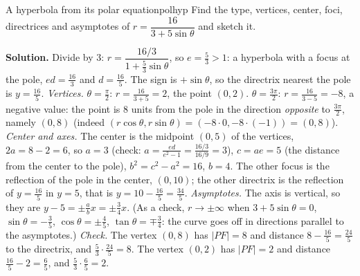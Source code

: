 \documentclass[11pt]{article}
\begin{document}
\begin{exmp}{A hyperbola from its polar equation}{polhyp}
Find the type, vertices, center, foci, directrices and asymptotes of $r=\dfrac{16}{3+5\sin\theta}$ and sketch it.

\textbf{Solution.} Divide by $3$: $r=\dfrac{16/3}{1+\frac53\sin\theta}$, so $e=\frac53>1$: a hyperbola with a focus at the pole, $ed=\frac{16}3$ and $d=\frac{16}5$. The sign is $+\sin\theta$, so the directrix nearest the pole is $y=\frac{16}5$. \emph{Vertices.} $\theta=\frac\pi2$: $r=\frac{16}{3+5}=2$, the point $(0,2)$. $\theta=\frac{3\pi}2$: $r=\frac{16}{3-5}=-8$, a negative value: the point is $8$ units from the pole in the direction \emph{opposite} to $\frac{3\pi}2$, namely $(0,8)$ (indeed $(r\cos\theta,r\sin\theta)=(-8\cdot0,-8\cdot(-1))=(0,8)$). \emph{Center and axes.} The center is the midpoint $(0,5)$ of the vertices, $2a=8-2=6$, so $a=3$ (check: $a=\frac{ed}{e^2-1}=\frac{16/3}{16/9}=3$), $c=ae=5$ (the distance from the center to the pole), $b^2=c^2-a^2=16$, $b=4$. The other focus is the reflection of the pole in the center, $(0,10)$; the other directrix is the reflection of $y=\frac{16}5$ in $y=5$, that is $y=10-\frac{16}5=\frac{34}5$. \emph{Asymptotes.} The axis is vertical, so they are $y-5=\pm\frac abx=\pm\frac34x$. (As a check, $r\to\pm\infty$ when $3+5\sin\theta=0$, $\sin\theta=-\frac35$, $\cos\theta=\pm\frac45$, $\tan\theta=\mp\frac34$: the curve goes off in directions parallel to the asymptotes.)
\emph{Check.} The vertex $(0,8)$ has $\lvert PF\rvert=8$ and distance $8-\frac{16}5=\frac{24}5$ to the directrix, and $\frac53\cdot\frac{24}5=8$. The vertex $(0,2)$ has $\lvert PF\rvert=2$ and distance $\frac{16}5-2=\frac65$, and $\frac53\cdot\frac65=2$.


\end{exmp}
\end{document}
